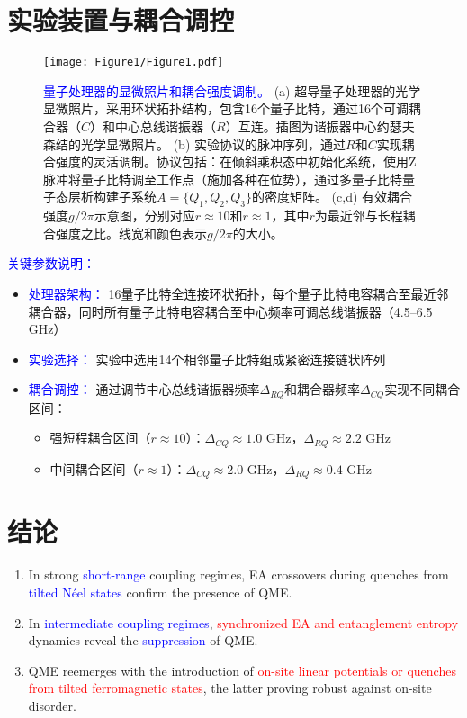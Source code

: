 \documentclass[11pt,a4paper]{article}
\begin{document}
\section{实验装置与耦合调控}

\begin{figure}[H]
    \centering
    \texttt{[image: Figure1/Figure1.pdf]}
    \caption{
        \textcolor{blue}{量子处理器的显微照片和耦合强度调制。}
        (a) 超导量子处理器的光学显微照片，采用环状拓扑结构，包含16个量子比特，通过16个可调耦合器（$C$）和中心总线谐振器（$R$）互连。插图为谐振器中心约瑟夫森结的光学显微照片。
        (b) 实验协议的脉冲序列，通过$R$和$C$实现耦合强度的灵活调制。协议包括：在倾斜乘积态中初始化系统，使用Z脉冲将量子比特调至工作点（施加各种在位势），通过多量子比特量子态层析构建子系统$A=\{Q_1,Q_2,Q_3\}$的密度矩阵。
        (c,d) 有效耦合强度$g/2\pi$示意图，分别对应$r\approx 10$和$r\approx 1$，其中$r$为最近邻与长程耦合强度之比。线宽和颜色表示$g/2\pi$的大小。
    }
    \label{fig:device_and_coupling}
\end{figure}

\textcolor{blue}{关键参数说明：}
\begin{itemize}
    \item \textcolor{blue}{处理器架构：} 16量子比特全连接环状拓扑，每个量子比特电容耦合至最近邻耦合器，同时所有量子比特电容耦合至中心频率可调总线谐振器（4.5–6.5 GHz）
    \item \textcolor{blue}{实验选择：} 实验中选用14个相邻量子比特组成紧密连接链状阵列
    \item \textcolor{blue}{耦合调控：} 通过调节中心总线谐振器频率$\Delta_{RQ}$和耦合器频率$\Delta_{CQ}$实现不同耦合区间：
    \begin{itemize}
        \item 强短程耦合区间（$r\approx 10$）：$\Delta_{CQ}\approx 1.0$ GHz，$\Delta_{RQ}\approx 2.2$ GHz
        \item 中间耦合区间（$r\approx 1$）：$\Delta_{CQ}\approx 2.0$ GHz，$\Delta_{RQ}\approx 0.4$ GHz
    \end{itemize}
\end{itemize}


\section{结论}
\begin{enumerate}
    \item In strong \textcolor{blue}{short-range} coupling regimes, EA crossovers during quenches from \textcolor{blue}{tilted Néel states} confirm the presence of QME.
    \item In \textcolor{blue}{intermediate coupling regimes}, \textcolor{red}{synchronized EA and entanglement entropy} dynamics reveal the \textcolor{blue}{suppression} of QME.
    \item QME reemerges with the introduction of \textcolor{red}{on-site linear potentials or quenches from tilted ferromagnetic states}, the latter proving robust against on-site disorder.
\end{enumerate}
\end{document}
